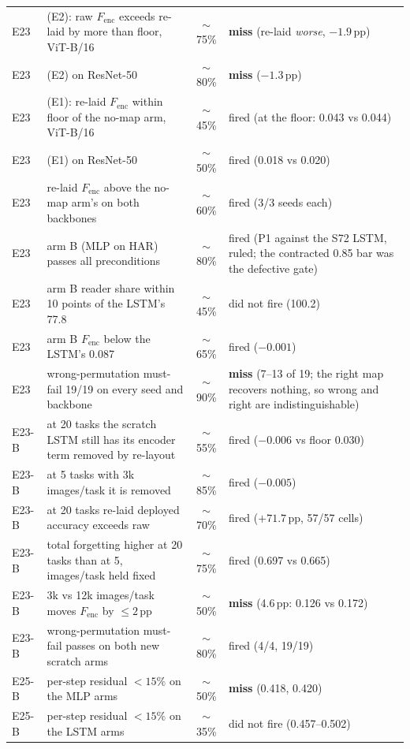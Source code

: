 \begin{center}
\begin{tabular}{@{}llcl@{}}
E23 & (E2): raw $F_{\mathrm{enc}}$ exceeds re-laid by more than floor, ViT-B/16 & $\sim$75\% & \textbf{miss} (re-laid \emph{worse}, $-1.9$\,pp) \\
E23 & (E2) on ResNet-50 & $\sim$80\% & \textbf{miss} ($-1.3$\,pp) \\
E23 & (E1): re-laid $F_{\mathrm{enc}}$ within floor of the no-map arm, ViT-B/16 & $\sim$45\% & fired (at the floor: 0.043 vs 0.044) \\
E23 & (E1) on ResNet-50 & $\sim$50\% & fired (0.018 vs 0.020) \\
E23 & re-laid $F_{\mathrm{enc}}$ above the no-map arm's on both backbones & $\sim$60\% & fired (3/3 seeds each) \\
E23 & arm B (MLP on HAR) passes all preconditions & $\sim$80\% & fired (P1 against the S72 LSTM, ruled; the contracted 0.85 bar was the defective gate) \\
E23 & arm B reader share within 10 points of the LSTM's 77.8 & $\sim$45\% & did not fire (100.2) \\
E23 & arm B $F_{\mathrm{enc}}$ below the LSTM's 0.087 & $\sim$65\% & fired ($-0.001$) \\
E23 & wrong-permutation must-fail 19/19 on every seed and backbone & $\sim$90\% & \textbf{miss} (7--13 of 19; the right map recovers nothing, so wrong and right are indistinguishable) \\
E23-B & at 20 tasks the scratch LSTM still has its encoder term removed by re-layout & $\sim$55\% & fired ($-0.006$ vs floor 0.030) \\
E23-B & at 5 tasks with 3k images/task it is removed & $\sim$85\% & fired ($-0.005$) \\
E23-B & at 20 tasks re-laid deployed accuracy exceeds raw & $\sim$70\% & fired ($+71.7$\,pp, 57/57 cells) \\
E23-B & total forgetting higher at 20 tasks than at 5, images/task held fixed & $\sim$75\% & fired (0.697 vs 0.665) \\
E23-B & 3k vs 12k images/task moves $F_{\mathrm{enc}}$ by $\le 2$\,pp & $\sim$50\% & \textbf{miss} (4.6\,pp: 0.126 vs 0.172) \\
E23-B & wrong-permutation must-fail passes on both new scratch arms & $\sim$80\% & fired (4/4, 19/19) \\
E25-B & per-step residual $<15\%$ on the MLP arms & $\sim$50\% & \textbf{miss} (0.418, 0.420) \\
E25-B & per-step residual $<15\%$ on the LSTM arms & $\sim$35\% & did not fire (0.457--0.502) \\

\end{tabular}
\end{center}

